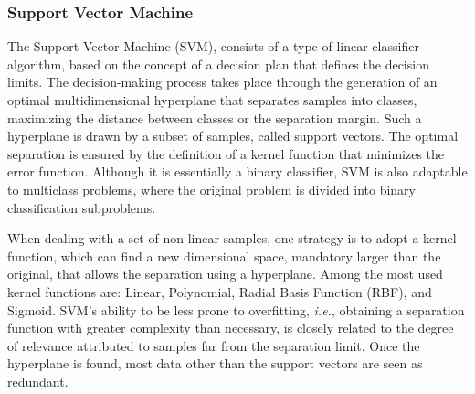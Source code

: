 \documentclass{ieeeaccess}
\begin{document}
\subsubsection{Support Vector Machine}
\label{subsubsec:svm}


The Support Vector Machine (SVM), consists of a type of linear classifier algorithm, based on the concept of a decision plan that defines the decision limits. The decision-making process takes place through the generation of an optimal multidimensional hyperplane that separates samples into classes, maximizing the distance between classes or the separation margin. Such a hyperplane is drawn by a subset of samples, called support vectors. The optimal separation is ensured by the definition of a kernel function that minimizes the error function. Although it is essentially a binary classifier, SVM is also adaptable to multiclass problems, where the original problem is divided into binary classification subproblems.


When dealing with a set of non-linear samples, one strategy is to adopt a kernel function, which can find a new dimensional space, mandatory larger than the original, that allows the separation using a hyperplane. Among the most used kernel functions are: Linear, Polynomial, Radial Basis Function (RBF), and Sigmoid. SVM's ability to be less prone to overfitting, \textit{i.e.}, obtaining a separation function with greater complexity than necessary, is closely related to the degree of relevance attributed to samples far from the separation limit. Once the hyperplane is found, most data other than the support vectors are seen as redundant.
\end{document}
